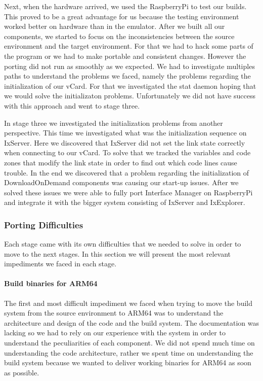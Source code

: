 Next, when the hardware arrived, we used the RaspberryPi to test our builds.
This proved to be a great advantage for us because the testing environment
worked better on hardware than in the emulator. After we built all our
components, we started to focus on the inconsistencies between the source
environment and the target environment.  For that we had to hack some parts of
the program or we had to make portable and consistent changes. However the
porting did not run as smoothly as we expected. We had to investigate multiples
paths to understand the problems we faced, namely the problems regarding the
initialization of our vCard. For that we investigated the stat daemon hoping
that we would solve the initializaton problems. Unfortunately we did not have
success with this approach and went to stage three.

In stage three we investigated the initialization problems from another
perspective. This time we investigated what was the initialization sequence on
IxServer. Here we discovered that IxServer did not set the link state correctly
when connecting to our vCard. To solve that we tracked the variables and code
zones that modify the link state in order to find out which code lines cause
trouble. In the end we discovered that a problem regarding the initialization
of DownloadOnDemand components was causing our start-up issues. After we solved
these issues we were able to fully port Interface Manager on RaspberryPi and
integrate it with the bigger system consisting of IxServer and IxExplorer.

\subsubsection{Porting Difficulties}

Each stage came with its own difficulties that we needed to solve in order to
move to the next stages. In this section we will present the most relevant
impediments we faced in each stage.

\paragraph{Build binaries for ARM64}

The first and most difficult impediment we faced when trying to move the build
system from the source environment to ARM64 was to understand the architecture
and design of the code and the build system. The documentation was lacking so
we had to rely on our experience with the system in order to understand the
peculiarities of each component. We did not spend much time on understanding the
code architecture, rather we spent time on understanding the build system
because we wanted to deliver working binaries for ARM64 as soon as possible.

